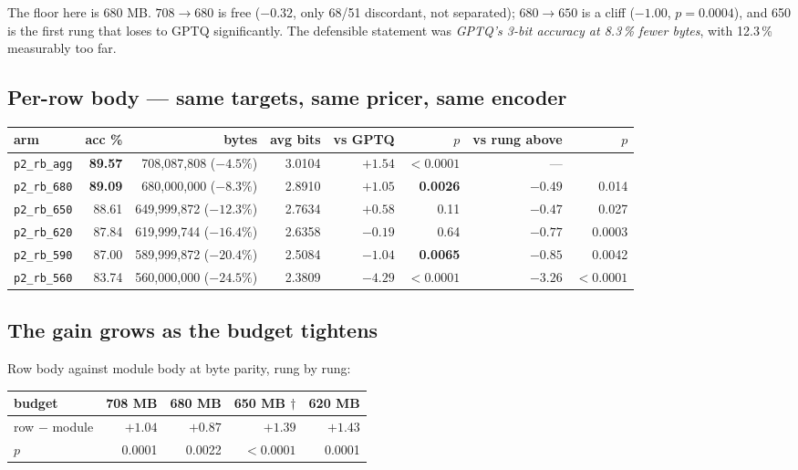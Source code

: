 \documentclass[11pt]{article}
\newcommand{\pct}{\,\%}
\newcommand{\code}[1]{\texttt{#1}}
\newcommand{\best}[1]{\textbf{#1}}
\begin{document}
The floor here is 680 MB. $708 \to 680$ is free ($-0.32$, only 68/51 discordant, not separated);
$680 \to 650$ is a cliff ($-1.00$, $p = 0.0004$), and 650 is the first rung that loses to GPTQ
significantly. The defensible statement was \emph{GPTQ's 3-bit accuracy at 8.3\pct{} fewer bytes},
with 12.3\pct{} measurably too far.

\subsection{Per-row body --- same targets, same pricer, same encoder}

\begin{center}\small
\begin{tabular}{@{}lrrrrrrr@{}}
\toprule
arm & acc \% & bytes & avg bits & vs GPTQ & $p$ & vs rung above & $p$ \\
\midrule
\rowcolor{winbg}
\code{p2\_rb\_agg} & \best{89.57} & 708{,}087{,}808 ($-4.5\%$) & 3.0104 & \best{$+1.54$} & \best{$<0.0001$} & --- & \\
\rowcolor{winbg}
\code{p2\_rb\_680} & \best{89.09} & 680{,}000{,}000 ($-8.3\%$) & 2.8910 & \best{$+1.05$} & \best{0.0026} & $-0.49$ & 0.014 \\
\code{p2\_rb\_650} & 88.61 & 649{,}999{,}872 ($-12.3\%$) & 2.7634 & $+0.58$ & 0.11 & $-0.47$ & 0.027 \\
\code{p2\_rb\_620} & 87.84 & 619{,}999{,}744 ($-16.4\%$) & 2.6358 & $-0.19$ & 0.64 & $-0.77$ & 0.0003 \\
\code{p2\_rb\_590} & 87.00 & 589{,}999{,}872 ($-20.4\%$) & 2.5084 & \best{$-1.04$} & \best{0.0065} & $-0.85$ & 0.0042 \\
\rowcolor{ctlbg}
\code{p2\_rb\_560} & 83.74 & 560{,}000{,}000 ($-24.5\%$) & 2.3809 & \best{$-4.29$} & \best{$<0.0001$} & \best{$-3.26$} & \best{$<0.0001$} \\
\bottomrule
\end{tabular}
\end{center}

\subsection{The gain grows as the budget tightens}

Row body against module body at byte parity, rung by rung:

\begin{center}\small
\begin{tabular}{@{}lrrrr@{}}
\toprule
budget & 708 MB & 680 MB & 650 MB $\dagger$ & 620 MB \\
\midrule
row $-$ module & $+1.04$ & $+0.87$ & $+1.39$ & $+1.43$ \\
$p$ & 0.0001 & 0.0022 & $<0.0001$ & 0.0001 \\
\bottomrule
\end{tabular}
\end{center}
\end{document}
